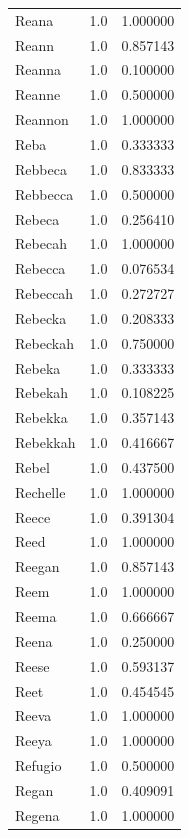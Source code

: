 \documentclass[
  letterpaper,
  DIV=11,
  numbers=noendperiod]{scrreprt}
\begin{document}
\begin{tabular}{lrr}
Reana           &   1.0 &   1.000000 \\
Reann           &   1.0 &   0.857143 \\
Reanna          &   1.0 &   0.100000 \\
Reanne          &   1.0 &   0.500000 \\
Reannon         &   1.0 &   1.000000 \\
Reba            &   1.0 &   0.333333 \\
Rebbeca         &   1.0 &   0.833333 \\
Rebbecca        &   1.0 &   0.500000 \\
Rebeca          &   1.0 &   0.256410 \\
Rebecah         &   1.0 &   1.000000 \\
Rebecca         &   1.0 &   0.076534 \\
Rebeccah        &   1.0 &   0.272727 \\
Rebecka         &   1.0 &   0.208333 \\
Rebeckah        &   1.0 &   0.750000 \\
Rebeka          &   1.0 &   0.333333 \\
Rebekah         &   1.0 &   0.108225 \\
Rebekka         &   1.0 &   0.357143 \\
Rebekkah        &   1.0 &   0.416667 \\
Rebel           &   1.0 &   0.437500 \\
Rechelle        &   1.0 &   1.000000 \\
Reece           &   1.0 &   0.391304 \\
Reed            &   1.0 &   1.000000 \\
Reegan          &   1.0 &   0.857143 \\
Reem            &   1.0 &   1.000000 \\
Reema           &   1.0 &   0.666667 \\
Reena           &   1.0 &   0.250000 \\
Reese           &   1.0 &   0.593137 \\
Reet            &   1.0 &   0.454545 \\
Reeva           &   1.0 &   1.000000 \\
Reeya           &   1.0 &   1.000000 \\
Refugio         &   1.0 &   0.500000 \\
Regan           &   1.0 &   0.409091 \\
Regena          &   1.0 &   1.000000 \\

\end{tabular}
\end{document}
